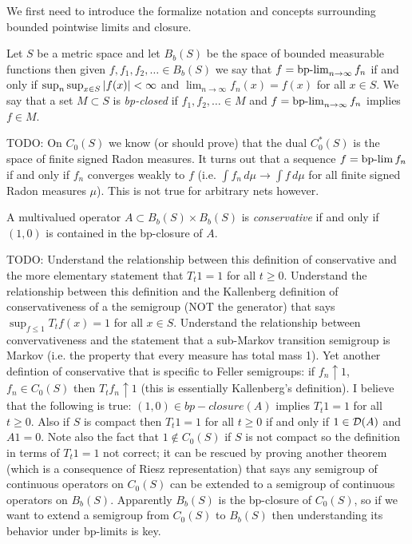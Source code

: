 We first need to introduce the formalize notation and concepts surrounding bounded pointwise limits and closure.

\begin{defn}Let $S$ be a metric space and let $B_b(S)$ be the space of bounded measurable functions then given $f, f_1, f_2, \dotsc \in B_b(S)$ we say that $f = \operatorname*{bp-lim}_{n \to \infty} f_n$ if and only if $\sup_n \sup_{x \in S} \left \vert f(x) \right \vert < \infty$ and $\lim_{n \to \infty} f_n(x) = f(x)$ for all $x \in S$.  We say that a set $M \subset S$ is \emph{bp-closed} if $f_1, f_2, \dotsc \in M$ and $f = \operatorname*{bp-lim}_{n \to \infty} f_n$ implies $f \in M$.  
\end{defn}

TODO:  On $C_0(S)$ we know (or should prove) that the dual $C^*_0(S)$ is the space of finite signed Radon measures.  It turns out that a sequence $f = \operatorname*{bp-lim} f_n$ if and only if $f_n$ converges weakly to $f$ (i.e. $\int f_n \, d \mu \to \int f  \, d\mu$ for all finite signed Radon measures $\mu$).  This is not true for arbitrary nets however.

\begin{defn}A multivalued operator $A \subset B_b(S) \times B_b(S)$ is \emph{conservative} if and only if $(1,0)$ is contained in the bp-closure of $A$.
\end{defn}

TODO: Understand the relationship between this definition of conservative and the more elementary statement that $T_t 1 = 1$ for all $t \geq 0$.  Understand the relationship between this definition and the Kallenberg definition of conservativeness of a the semigroup (NOT the generator) that says $\sup_{f \leq 1} T_t f (x) = 1$ for all $x \in S$.  Understand the relationship between convervativeness and the statement that a sub-Markov transition semigroup is Markov (i.e. the property that every measure has total mass 1).  Yet another defintion of conservative that is specific to Feller semigroups: if $f_n \uparrow 1$, $f_n \in C_0(S)$ then $T_t f_n \uparrow 1$ (this is essentially Kallenberg's definition).  I believe that the following is true: $(1,0) \in bp-closure(A)$ implies $T_t 1 = 1$ for all $t \geq 0$.  Also if $S$ is compact then $T_t 1 = 1$ for all $t \geq 0$ if and only if $1 \in \mathcal{D}(A)$ and $A 1 = 0$.  Note also the fact that $1 \notin C_0(S)$ if $S$ is not compact so the definition in terms of $T_t 1 = 1$ not correct; it can be rescued by proving another theorem (which is a consequence of Riesz representation) that says any semigroup of continuous operators on $C_0(S)$ can be extended to a semigroup of continuous operators on $B_b(S)$.  Apparently $B_b(S)$ is the bp-closure of $C_0(S)$, so if we want to extend a semigroup from $C_0(S)$ to $B_b(S)$ then understanding its behavior under bp-limits is key.

